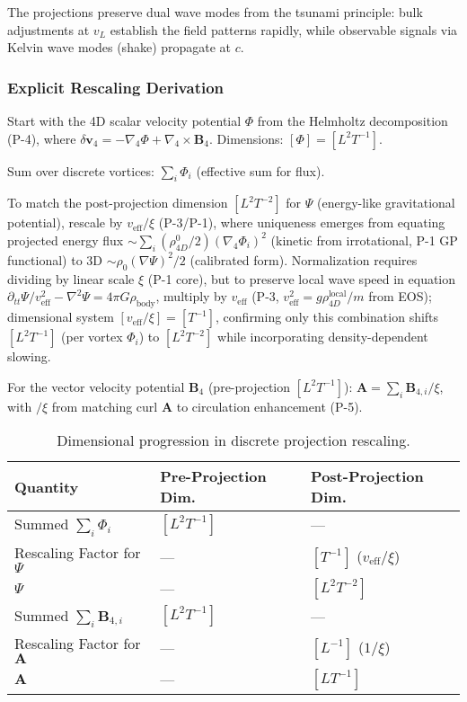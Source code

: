 The projections preserve dual wave modes from the tsunami principle: bulk adjustments at $v_L$ establish the field patterns rapidly, while observable signals via Kelvin wave modes (shake) propagate at $c$.

\subsubsection{Explicit Rescaling Derivation}

Start with the 4D scalar velocity potential $\Phi$ from the Helmholtz decomposition (P-4), where $\delta \mathbf{v}_4 = -\nabla_4 \Phi + \nabla_4 \times \mathbf{B}_4$. Dimensions: $[\Phi] = [L^2 T^{-1}]$.

Sum over discrete vortices: $\sum_i \Phi_i$ (effective sum for flux).

To match the post-projection dimension $[L^2 T^{-2}]$ for $\Psi$ (energy-like gravitational potential), rescale by $v_{\text{eff}} / \xi$ (P-3/P-1), where uniqueness emerges from equating projected energy flux $\sim \sum_i (\rho_{4D}^0 / 2) (\nabla_4 \Phi_i)^2$ (kinetic from irrotational, P-1 GP functional) to 3D $\sim \rho_0 (\nabla \Psi)^2 / 2$ (calibrated form). Normalization requires dividing by linear scale $\xi$ (P-1 core), but to preserve local wave speed in equation $\partial_{tt} \Psi / v_{\text{eff}}^2 - \nabla^2 \Psi = 4\pi G \rho_{\text{body}}$, multiply by $v_{\text{eff}}$ (P-3, $v_{\text{eff}}^2 = g \rho_{4D}^{\text{local}} / m$ from EOS); dimensional system $[v_{\text{eff}} / \xi] = [T^{-1}]$, confirming only this combination shifts $[L^2 T^{-1}]$ (per vortex $\Phi_i$) to $[L^2 T^{-2}]$ while incorporating density-dependent slowing.

For the vector velocity potential $\mathbf{B}_4$ (pre-projection $[L^2 T^{-1}]$): $\mathbf{A} = \sum_i \mathbf{B}_{4,i} / \xi$, with $/ \xi$ from matching curl $\mathbf{A}$ to circulation enhancement (P-5).

\begin{table}[H]
\centering
\begin{tabular}{|l|l|l|}
\hline
Quantity & Pre-Projection Dim. & Post-Projection Dim. \\
\hline
Summed $\sum_i \Phi_i$ & $[L^2 T^{-1}]$ & --- \\
Rescaling Factor for $\Psi$ & --- & $[T^{-1}]$ ($v_{\text{eff}} / \xi$) \\
$\Psi$ & --- & $[L^2 T^{-2}]$ \\
Summed $\sum_i \mathbf{B}_{4,i}$ & $[L^2 T^{-1}]$ & --- \\
Rescaling Factor for $\mathbf{A}$ & --- & $[L^{-1}]$ ($1 / \xi$) \\
$\mathbf{A}$ & --- & $[L T^{-1}]$ \\
\hline
\end{tabular}
\caption{Dimensional progression in discrete projection rescaling.}
\label{tab:dim-projection}
\end{table}

